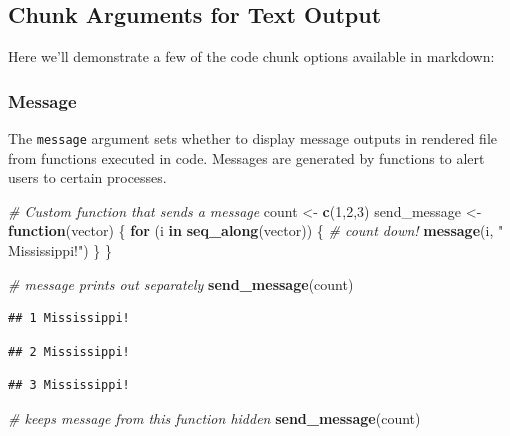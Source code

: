 \documentclass[
]{article}
\newenvironment{Shaded}{\begin{snugshade}}{\end{snugshade}}
\newcommand{\CommentTok}[1]{\textcolor[rgb]{0.56,0.35,0.01}{\textit{#1}}}
\newcommand{\ControlFlowTok}[1]{\textcolor[rgb]{0.13,0.29,0.53}{\textbf{#1}}}
\newcommand{\DecValTok}[1]{\textcolor[rgb]{0.00,0.00,0.81}{#1}}
\newcommand{\FunctionTok}[1]{\textcolor[rgb]{0.13,0.29,0.53}{\textbf{#1}}}
\newcommand{\NormalTok}[1]{#1}
\newcommand{\OtherTok}[1]{\textcolor[rgb]{0.56,0.35,0.01}{#1}}
\newcommand{\StringTok}[1]{\textcolor[rgb]{0.31,0.60,0.02}{#1}}
\begin{document}
\subsection{Chunk Arguments for Text
Output}\label{chunk-arguments-for-text-output}

Here we'll demonstrate a few of the code chunk options available in
markdown:

\subsubsection{Message}\label{message}

The \texttt{message} argument sets whether to display message outputs in
rendered file from functions executed in code. Messages are generated by
functions to alert users to certain processes.

\begin{Shaded}
\begin{Highlighting}[]
\CommentTok{\# Custom function that sends a message }
\NormalTok{count }\OtherTok{\textless{}{-}} \FunctionTok{c}\NormalTok{(}\DecValTok{1}\NormalTok{,}\DecValTok{2}\NormalTok{,}\DecValTok{3}\NormalTok{)}
\NormalTok{send\_message }\OtherTok{\textless{}{-}} \ControlFlowTok{function}\NormalTok{(vector) \{}
  \ControlFlowTok{for}\NormalTok{ (i }\ControlFlowTok{in} \FunctionTok{seq\_along}\NormalTok{(vector)) \{}
    \CommentTok{\# count down!}
    \FunctionTok{message}\NormalTok{(i, }\StringTok{" Mississippi!"}\NormalTok{)}
\NormalTok{  \}}
\NormalTok{\}}
\end{Highlighting}
\end{Shaded}

\begin{Shaded}
\begin{Highlighting}[]
\CommentTok{\# message prints out separately }
\FunctionTok{send\_message}\NormalTok{(count)}
\end{Highlighting}
\end{Shaded}

\begin{verbatim}
## 1 Mississippi!
\end{verbatim}

\begin{verbatim}
## 2 Mississippi!
\end{verbatim}

\begin{verbatim}
## 3 Mississippi!
\end{verbatim}

\begin{Shaded}
\begin{Highlighting}[]
\CommentTok{\# keeps message from this function hidden}
\FunctionTok{send\_message}\NormalTok{(count)}
\end{Highlighting}
\end{Shaded}
\end{document}
